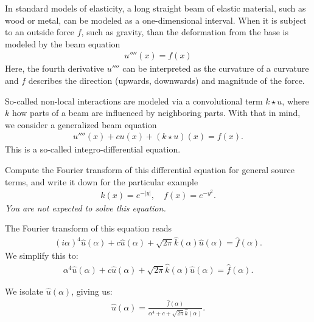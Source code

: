 \documentclass[11pt]{article}
\begin{document}
\begin{exercise}
    In standard models of elasticity, a long straight beam of elastic material, such as wood or metal, can be modeled as a one-dimensional interval. 
    When it is subject to an outside force $f$, such as gravity, than the deformation from the base is modeled by the beam equation 
    \begin{align}
        u''''(x) = f(x)
    \end{align}
    Here, the fourth derivative $u''''$ can be interpreted as the curvature of a curvature and $f$ describes the direction (upwards, downwards) and magnitude of the force.
    
    So-called non-local interactions are modeled via a convolutional term $k \star u$, where $k$ how parts of a beam are influenced by neighboring parts.
    With that in mind, we consider a generalized beam equation 
    \begin{align}
        u''''(x) + c u(x) + ( k \star u )(x) = f(x)
        .
    \end{align}
    This is a so-called integro-differential equation. 
    
    Compute the Fourier transform of this differential equation for general source terms,
    and write it down for the particular example
    \begin{align}
        k(x) = e^{-|y|},
        \quad 
        f(x) = e^{-y^{2}}.
    \end{align}
    \textit{You are not expected to solve this equation.}
\end{exercise}
\begin{solution}
    The Fourier transform of this equation reads
    \begin{align}
        (i\alpha)^{4} \hat u(\alpha) + c \hat u(\alpha) + \sqrt{2\pi} \hat k(\alpha) \hat u(\alpha) = \hat f(\alpha)
        .
    \end{align}
    We simplify this to:
    \begin{align}
        \alpha^{4} \hat u(\alpha) + c \hat u(\alpha) + \sqrt{2\pi} \hat k(\alpha) \hat u(\alpha) = \hat f(\alpha)
        .
    \end{align}
    
    We isolate $\hat u(\alpha)$, giving us:
    \begin{align}
        \hat u(\alpha)
        =
        \frac{\hat f(\alpha)}{ \alpha^{4} + c + \sqrt{2\pi} \hat k(\alpha) }
        .
    \end{align}
\end{solution}
\end{document}
